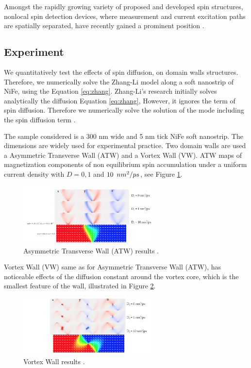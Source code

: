 Amongst the rapidly growing variety of proposed and developed spin structures, nonlocal spin detection devices, where measurement and current excitation paths are spatially separated, have recently gained a prominent position \cite{spinz}.

\subsection{Experiment}

We quantitatively test the effects of spin diffusion, on domain walls structures. Therefore, we numerically solve the Zhang-Li model along a soft nanostrip of NiFe, using the Equation \ref{eq:zhang}. Zhang-Li's research initially solves analytically the diffusion Equation \ref{eq:zhang}, However, it ignores the term of spin diffusion. Therefore we numerically solve the solution of the mode including the spin diffusion term \cite{zhang}.

The sample considered is a 300 nm wide and 5 nm tick NiFe soft nanostrip. The dimensions are widely used for experimental practice. Two domain walls are used a Asymmetric Transverse Wall (ATW) and a Vortex Wall (VW). ATW maps of magnetization components of non equilibrium spin accumulation under a uniform current density with $D = 0, 1$ and $10 \enskip nm^2 / ps$, see Figure \ref{fig:atw}.

\begin{figure}[htbp]
	\centering
		\includegraphics[width=0.64\textwidth]{Figures/ATW.png}
		\smallskip
	\caption[Asymmetric transverse wall results]{Asymmetric Transverse Wall (ATW) results \cite{claudio}.}
	\label{fig:atw}
\end{figure}

Vortex Wall (VW) same as for Asymmetric Transverse Wall (ATW), has noticeable effects of the diffusion constant around the vortex core, which is the smallest feature of the wall, illustrated in Figure \ref{fig:vw}.

\begin{figure}[htbp]
	\centering
		\includegraphics[width=0.64\textwidth]{Figures/VW.png}
		\smallskip
	\caption[Vortex wall results]{Vortex Wall results \cite{claudio}. }
	\label{fig:vw}
\end{figure}

